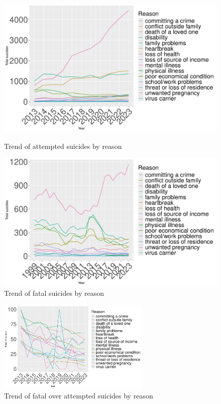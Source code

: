 \documentclass{article}
\begin{document}
\begin{figure}[H]
    \centering
    \begin{minipage}{0.65\textwidth}
        \includegraphics[width=\textwidth]{imgs/reason_attempted.pdf}
        \caption{Trend of attempted suicides by reason }
	\label{reason_attempted}
    \end{minipage}
    \hfill
    \begin{minipage}{0.65\textwidth}
        \includegraphics[width=\textwidth]{imgs/reason_fatal.pdf}
        \caption{Trend of fatal suicides by reason }
	\label{reason_fatal}
    \end{minipage}
\end{figure}

\begin{figure}[H]
    \centering
    \includegraphics[width=0.65\textwidth]{imgs/reason_foa.pdf}
    \caption{Trend of fatal over attempted suicides by reason }
    \label{reason_foa}
\end{figure}
\end{document}
